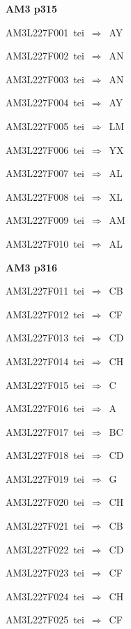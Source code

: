 \par\vfill\eject
{\bf\hfill AM3 p315\hfill\hbox{}}\par\bigskip
{\sixrm AM3L227F001\ {\sixit tei}\ }$\Rightarrow$\ AY\par\smallskip
{\sixrm AM3L227F002\ {\sixit tei}\ }$\Rightarrow$\ AN\par\smallskip
{\sixrm AM3L227F003\ {\sixit tei}\ }$\Rightarrow$\ AN\par\smallskip
{\sixrm AM3L227F004\ {\sixit tei}\ }$\Rightarrow$\ AY\par\smallskip
{\sixrm AM3L227F005\ {\sixit tei}\ }$\Rightarrow$\ LM\par\smallskip
{\sixrm AM3L227F006\ {\sixit tei}\ }$\Rightarrow$\ YX\par\smallskip
{\sixrm AM3L227F007\ {\sixit tei}\ }$\Rightarrow$\ AL\par\smallskip
{\sixrm AM3L227F008\ {\sixit tei}\ }$\Rightarrow$\ XL\par\smallskip
{\sixrm AM3L227F009\ {\sixit tei}\ }$\Rightarrow$\ AM\par\smallskip
{\sixrm AM3L227F010\ {\sixit tei}\ }$\Rightarrow$\ AL\par\smallskip

\par\vfill\eject
{\bf\hfill AM3 p316\hfill\hbox{}}\par\bigskip
{\sixrm AM3L227F011\ {\sixit tei}\ }$\Rightarrow$\ CB\par\smallskip
{\sixrm AM3L227F012\ {\sixit tei}\ }$\Rightarrow$\ CF\par\smallskip
{\sixrm AM3L227F013\ {\sixit tei}\ }$\Rightarrow$\ CD\par\smallskip
{\sixrm AM3L227F014\ {\sixit tei}\ }$\Rightarrow$\ CH\par\smallskip
{\sixrm AM3L227F015\ {\sixit tei}\ }$\Rightarrow$\ C\par\smallskip
{\sixrm AM3L227F016\ {\sixit tei}\ }$\Rightarrow$\ A\par\smallskip
{\sixrm AM3L227F017\ {\sixit tei}\ }$\Rightarrow$\ BC\par\smallskip
{\sixrm AM3L227F018\ {\sixit tei}\ }$\Rightarrow$\ CD\par\smallskip
{\sixrm AM3L227F019\ {\sixit tei}\ }$\Rightarrow$\ G\par\smallskip
{\sixrm AM3L227F020\ {\sixit tei}\ }$\Rightarrow$\ CH\par\smallskip
{\sixrm AM3L227F021\ {\sixit tei}\ }$\Rightarrow$\ CB\par\smallskip
{\sixrm AM3L227F022\ {\sixit tei}\ }$\Rightarrow$\ CD\par\smallskip
{\sixrm AM3L227F023\ {\sixit tei}\ }$\Rightarrow$\ CF\par\smallskip
{\sixrm AM3L227F024\ {\sixit tei}\ }$\Rightarrow$\ CH\par\smallskip
{\sixrm AM3L227F025\ {\sixit tei}\ }$\Rightarrow$\ CF\par\smallskip

